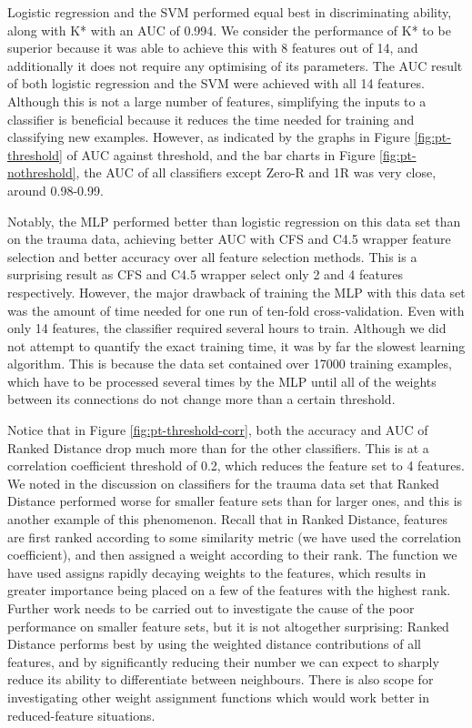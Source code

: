 

Logistic regression and the SVM performed equal best in discriminating ability,
along with K* with an AUC of 0.994. We consider the performance of K* to be
superior because it was able to achieve this with 8 features out of 14, and
additionally it does not require any optimising of its parameters.
The AUC result of both logistic regression and the SVM were achieved with all
14 features. Although this is not a large number of features, simplifying the
inputs to a classifier is beneficial because it reduces the time needed for
training and classifying new examples. However, as indicated by the graphs in
Figure \ref{fig:pt-threshold} of AUC against threshold, and the bar charts in
Figure \ref{fig:pt-nothreshold}, the AUC of all classifiers except Zero-R and
1R was very close, around 0.98-0.99.

Notably, the MLP performed better than logistic regression on this data set
than on the trauma data, achieving better AUC with CFS and C4.5 wrapper feature
selection and better accuracy over all feature selection methods. This is a
surprising result as CFS and C4.5 wrapper select only 2 and 4 features
respectively. However, the major drawback of training the MLP with this data
set was the amount of time needed for one run of ten-fold cross-validation.
Even with only 14 features, the classifier required several hours to train.
Although we did not attempt to quantify the exact training time, it was by far
the slowest learning algorithm.
This is because the data set contained over 17000 training examples, which have
to be processed several times by the MLP until all of the weights between its
connections do not change more than a certain threshold.

Notice that in Figure \ref{fig:pt-threshold-corr}, both the accuracy and AUC
of Ranked Distance drop much more than for the other classifiers. This is at
a correlation coefficient threshold of 0.2, which reduces the feature set to
4 features. We noted in the discussion on classifiers for the trauma data set
that Ranked Distance performed worse for smaller feature sets than for larger
ones, and this is another example of this phenomenon. Recall that in Ranked
Distance, features are first ranked according to some similarity metric (we
have used the correlation coefficient), and then assigned a weight according
to their rank. The function we have used assigns rapidly decaying weights to
the features, which results in greater importance being placed on a few of
the features with the highest rank. Further work needs to be carried out to
investigate the cause of the poor performance on smaller feature sets, but
it is not altogether surprising: Ranked Distance performs best by using the
weighted distance contributions of all features, and by significantly reducing
their number we can expect to sharply reduce its ability to differentiate
between neighbours. There is also scope for investigating other weight
assignment functions which would work better in reduced-feature situations.

